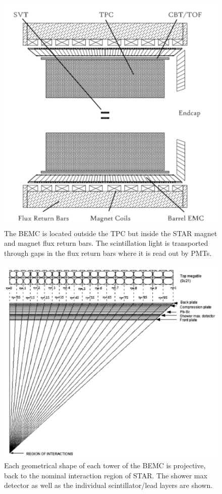 \documentclass[letterpaper, abstract = on,listof=totoc, bibliography=totoc]{scrreprt}
\begin{document}
\begin{figure}
\begin{center}
\includegraphics[width = .7\textwidth]{BEMC1}
\caption[Barrel Electromagnetic Calorimeter]{The BEMC is located outside the TPC but inside the STAR magnet and magnet flux return bars. The scintillation light is transported through gaps in the flux return bars where it is read out by PMTs.}
\label{fig:BEMC1}
\end{center}
\end{figure}

\begin{figure}
\begin{center}
\includegraphics[width = .7\textwidth]{BEMC2}
\caption[Barrel Electromagnetic Calorimeter 2]{Each geometrical shape of each tower of the BEMC is projective, back to the nominal interaction region of STAR. The shower max detector as well as the individual scintillator/lead layers are shown.}
\label{fig:BEMC2}
\end{center}
\end{figure}
\end{document}
